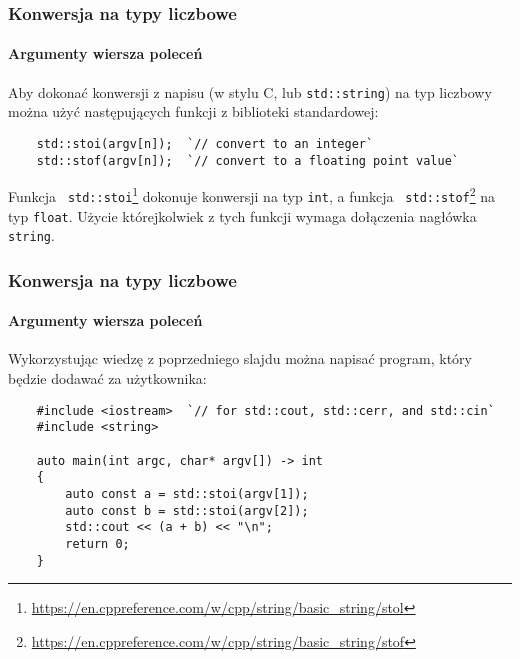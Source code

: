 \documentclass[aspectratio=169]{beamer}
\begin{document}
\begin{frame}[fragile]
    \frametitle{Konwersja na typy liczbowe}
    \framesubtitle{Argumenty wiersza poleceń}

    Aby dokonać konwersji z napisu (w stylu C, lub {\tt std::string}) na typ
    liczbowy można użyć następujących funkcji z biblioteki standardowej:

    \vspace{1em}
    {\footnotesize
    \begin{lstlisting}
    std::stoi(argv[n]);  `// convert to an integer`
    std::stof(argv[n]);  `// convert to a floating point value`
    \end{lstlisting}}
    \vspace{1em}

    Funkcja {\tt
    std::stoi}\footnote{\url{https://en.cppreference.com/w/cpp/string/basic_string/stol}}
    dokonuje konwersji na typ {\tt int}, a funkcja {\tt
    std::stof}\footnote{\url{https://en.cppreference.com/w/cpp/string/basic_string/stof}}
    na typ {\tt float}.
    Użycie którejkolwiek z tych funkcji wymaga dołączenia nagłówka {\tt string}.
\end{frame}

\begin{frame}[fragile]
    \frametitle{Konwersja na typy liczbowe}
    \framesubtitle{Argumenty wiersza poleceń}

    Wykorzystując wiedzę z poprzedniego slajdu można napisać program, który
    będzie dodawać za użytkownika:

    {\scriptsize
    \begin{lstlisting}
    #include <iostream>  `// for std::cout, std::cerr, and std::cin`
    #include <string>

    auto main(int argc, char* argv[]) -> int
    {
        auto const a = std::stoi(argv[1]);
        auto const b = std::stoi(argv[2]);
        std::cout << (a + b) << "\n";
        return 0;
    }
    \end{lstlisting}}
\end{frame}
\end{document}
